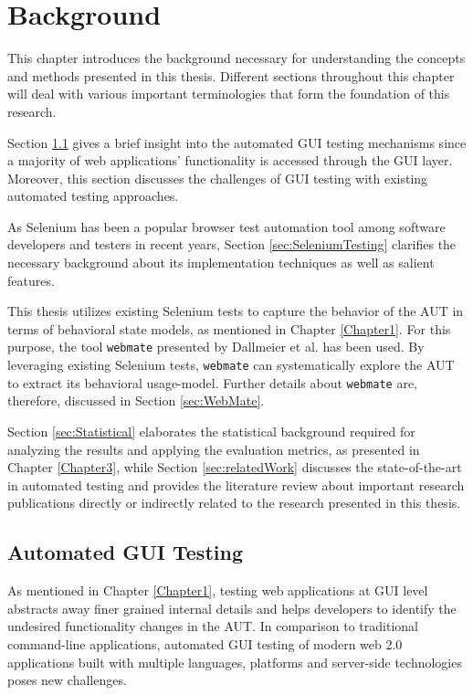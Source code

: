 \chapter{Background}
\label{Chapter2}


This chapter introduces the background necessary for understanding the concepts and methods presented in this thesis. Different sections throughout this chapter will deal with various important terminologies that form the foundation of this research. 

Section \ref{sec:AutomatedGUITesting} gives a brief insight into the automated GUI testing mechanisms since a majority of web applications' functionality is accessed through the GUI layer. Moreover, this section discusses the challenges of GUI testing with existing automated testing approaches. 

As Selenium \cite{websiteSelenium} has been a popular browser test automation tool among software developers and testers in recent years, Section \ref{sec:SeleniumTesting} clarifies the necessary background about its implementation techniques as well as salient features.

This thesis utilizes existing Selenium tests to capture the behavior of the AUT in terms of behavioral state models, as mentioned in Chapter \ref{Chapter1}. For this purpose, the tool \texttt{webmate} presented by Dallmeier et al. \cite{webmate} has been used. By leveraging existing Selenium tests, \texttt{webmate} can systematically explore the AUT to extract its behavioral usage-model. Further details about \texttt{webmate} are, therefore, discussed in Section \ref{sec:WebMate}.

Section \ref{sec:Statistical} elaborates the statistical background required for analyzing the results and applying the evaluation metrics, as presented in Chapter \ref{Chapter3}, while Section \ref{sec:relatedWork} discusses the state-of-the-art in automated testing and provides the literature review about important research publications directly or indirectly related to the research presented in this thesis. 

\section{Automated GUI Testing}
\label{sec:AutomatedGUITesting}
As mentioned in Chapter \ref{Chapter1}, testing web applications at GUI level abstracts away finer grained internal details and helps developers to identify the undesired functionality changes in the AUT. In comparison to traditional command-line applications, automated GUI testing of modern web 2.0 applications built with multiple languages, platforms and server-side technologies poses new challenges.

